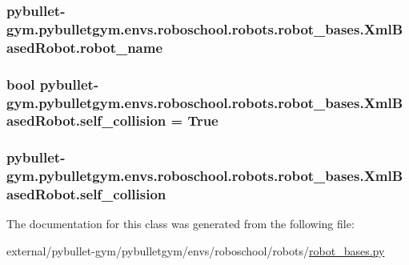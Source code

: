 \subsubsection[{\texorpdfstring{robot\+\_\+name}{robot_name}}]{\setlength{\rightskip}{0pt plus 5cm}pybullet-\/gym.\+pybulletgym.\+envs.\+roboschool.\+robots.\+robot\+\_\+bases.\+Xml\+Based\+Robot.\+robot\+\_\+name}\hypertarget{classpybullet-gym_1_1pybulletgym_1_1envs_1_1roboschool_1_1robots_1_1robot__bases_1_1_xml_based_robot_a27a9dfbfbfd4f3478cc4ea4ace80af97}{}\label{classpybullet-gym_1_1pybulletgym_1_1envs_1_1roboschool_1_1robots_1_1robot__bases_1_1_xml_based_robot_a27a9dfbfbfd4f3478cc4ea4ace80af97}
\subsubsection[{\texorpdfstring{self\+\_\+collision}{self_collision}}]{\setlength{\rightskip}{0pt plus 5cm}bool pybullet-\/gym.\+pybulletgym.\+envs.\+roboschool.\+robots.\+robot\+\_\+bases.\+Xml\+Based\+Robot.\+self\+\_\+collision = True\hspace{0.3cm}{\ttfamily [static]}}\hypertarget{classpybullet-gym_1_1pybulletgym_1_1envs_1_1roboschool_1_1robots_1_1robot__bases_1_1_xml_based_robot_ab6ba95cc9efcb674bb70711d09755b02}{}\label{classpybullet-gym_1_1pybulletgym_1_1envs_1_1roboschool_1_1robots_1_1robot__bases_1_1_xml_based_robot_ab6ba95cc9efcb674bb70711d09755b02}
\subsubsection[{\texorpdfstring{self\+\_\+collision}{self_collision}}]{\setlength{\rightskip}{0pt plus 5cm}pybullet-\/gym.\+pybulletgym.\+envs.\+roboschool.\+robots.\+robot\+\_\+bases.\+Xml\+Based\+Robot.\+self\+\_\+collision}\hypertarget{classpybullet-gym_1_1pybulletgym_1_1envs_1_1roboschool_1_1robots_1_1robot__bases_1_1_xml_based_robot_ac7498096e02a63a2532196028e673bff}{}\label{classpybullet-gym_1_1pybulletgym_1_1envs_1_1roboschool_1_1robots_1_1robot__bases_1_1_xml_based_robot_ac7498096e02a63a2532196028e673bff}


The documentation for this class was generated from the following file\+:\begin{DoxyCompactItemize}
\item 
external/pybullet-\/gym/pybulletgym/envs/roboschool/robots/\hyperlink{roboschool_2robots_2robot__bases_8py}{robot\+\_\+bases.\+py}\end{DoxyCompactItemize}
